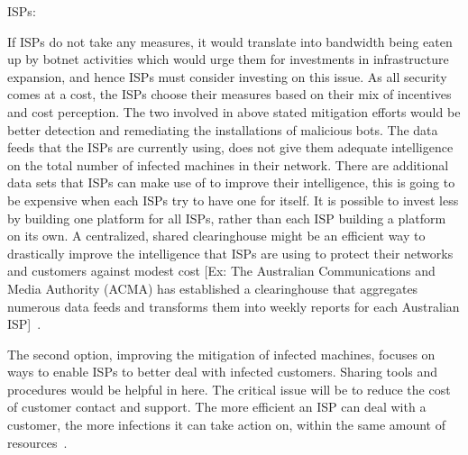  ISPs:
 
 If ISPs do not take any measures, it would translate into bandwidth being eaten up by botnet activities which would urge them for investments in infrastructure expansion, and hence ISPs must consider investing on this issue. As all security comes at a cost, the ISPs choose their measures based on their mix of incentives and cost perception. The two involved in above stated mitigation efforts would be better detection and remediating the installations of malicious bots. The data feeds that the ISPs are currently using, does not give them adequate intelligence on the total number of infected machines in their network. There are additional data sets that ISPs can make use of to improve their intelligence, this is going to be expensive when each ISPs try to have one for itself. It is possible to invest less by building one platform for all ISPs, rather than each ISP building a platform on its own. A centralized, shared clearinghouse might be an efficient way to drastically improve the intelligence that ISPs are using to protect their networks and customers against modest cost [Ex: The Australian Communications and Media Authority (ACMA) has established a clearinghouse that aggregates numerous data feeds and transforms them into weekly reports for each Australian ISP]~\cite{asghari2010botnet}.
 
 The second option, improving the mitigation of infected machines, focuses on ways to enable ISPs to better deal with infected customers. Sharing tools and procedures would be helpful in here. The critical issue will be to reduce the cost of customer contact and support. The more efficient an ISP can deal with a customer, the more infections it can take action on, within the same amount of resources~\cite{asghari2010botnet}.
 